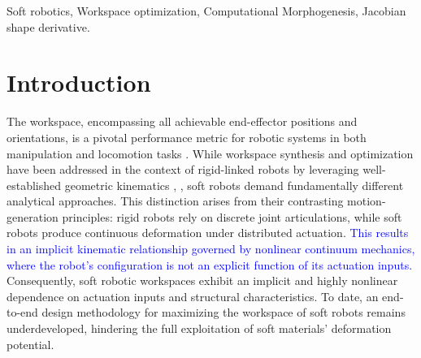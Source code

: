 \documentclass[journal]{IEEEtran}
\theoremstyle{definition}
\begin{document}
\begin{IEEEkeywords}
  Soft robotics, Workspace optimization, Computational Morphogenesis, Jacobian shape derivative.
\end{IEEEkeywords}

\section{Introduction}
\label{sec:introduction}

The workspace, encompassing all achievable end-effector positions and orientations, is a pivotal performance metric for robotic systems in both manipulation \cite{Jain_Dontu_Teoh_Alvarado_2023} and locomotion tasks \cite{Zhang_Yang_Yan_Zhou_Zou_Gu_2022}. While workspace synthesis and optimization have been addressed in the context of rigid-linked robots by leveraging well-established geometric kinematics \cite{doi:10.1177/027836499701600407}, \textcolor{blue}{\cite{9097447}}, soft robots demand fundamentally different analytical approaches. This distinction arises from their contrasting motion-generation principles: rigid robots rely on discrete joint articulations, while soft robots produce continuous deformation under distributed actuation. \textcolor{blue}{This results in an implicit kinematic relationship governed by nonlinear continuum mechanics, where the robot's configuration is not an explicit function of its actuation inputs.} Consequently, soft robotic workspaces exhibit an implicit and highly nonlinear dependence on actuation inputs and structural characteristics. To date, an end-to-end design methodology for maximizing the workspace of soft robots remains underdeveloped, hindering the full exploitation of soft materials' deformation potential.
\end{document}
